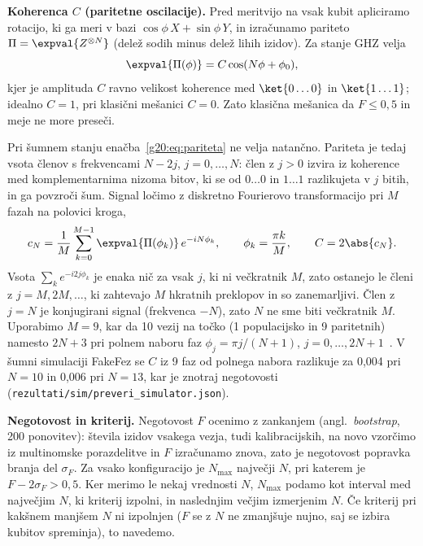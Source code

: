\textbf{Koherenca $C$ (paritetne oscilacije).} Pred meritvijo na vsak kubit apliciramo rotacijo, ki ga meri v bazi
$\cos\phi\,X+\sin\phi\,Y$, in izračunamo pariteto $\Pi=\expval{Z^{\otimes N}}$ (delež sodih minus delež lihih izidov). Za
stanje GHZ velja
\begin{equation}
\expval{\Pi(\phi)} = C\cos(N\phi + \phi_0),
\label{g20:eq:pariteta}
\end{equation}
kjer je amplituda $C$ ravno velikost koherence med $\ket{0\dots0}$ in $\ket{1\dots1}$; idealno $C=1$, pri klasični mešanici
$C=0$. Zato klasična mešanica da $F\le 0{,}5$ in meje ne more preseči.

Pri šumnem stanju enačba~\eqref{g20:eq:pariteta} ne velja natančno. Pariteta je tedaj vsota členov s frekvencami $N-2j$,
$j=0,\dots,N$: člen z $j>0$ izvira iz koherence med komplementarnima nizoma bitov, ki se od $0\dots0$ in $1\dots1$ razlikujeta v
$j$ bitih, in ga povzroči šum. Signal ločimo z diskretno Fourierovo transformacijo pri $M$ fazah na polovici kroga,
\begin{equation}
c_N = \frac{1}{M}\sum_{k=0}^{M-1} \expval{\Pi(\phi_k)}\, e^{-iN\phi_k}, \qquad \phi_k=\frac{\pi k}{M}, \qquad C = 2\abs{c_N}.
\label{g20:eq:dft}
\end{equation}
Vsota $\sum_k e^{-i2j\phi_k}$ je enaka nič za vsak $j$, ki ni večkratnik $M$, zato ostanejo le členi z $j=M, 2M,\dots$, ki
zahtevajo $M$ hkratnih preklopov in so zanemarljivi. Člen z $j=N$ je konjugirani signal (frekvenca $-N$), zato $N$ ne sme
biti večkratnik $M$. Uporabimo $M=9$, kar da 10 vezij na točko (1 populacijsko in 9 paritetnih) namesto $2N+3$ pri polnem
naboru faz $\phi_j=\pi j/(N+1)$, $j=0,\dots,2N+1$~\cite{g20:wei2020}. V šumni simulaciji FakeFez se $C$ iz 9 faz od polnega
nabora razlikuje za 0,004 pri $N=10$ in 0,006 pri $N=13$, kar je znotraj negotovosti (\texttt{rezultati/sim/preveri\_simulator.json}).

\textbf{Negotovost in kriterij.} Negotovost $F$ ocenimo z zankanjem (angl.\ \emph{bootstrap}, 200 ponovitev): števila izidov
vsakega vezja, tudi kalibracijskih, na novo vzorčimo iz multinomske porazdelitve in $F$ izračunamo znova, zato je negotovost
popravka branja del $\sigma_F$. Za vsako konfiguracijo je $N_{\max}$ največji $N$, pri katerem je $F-2\sigma_F>0{,}5$. Ker
merimo le nekaj vrednosti $N$, $N_{\max}$ podamo kot interval med največjim $N$, ki kriterij izpolni, in naslednjim večjim
izmerjenim $N$. Če kriterij pri kakšnem manjšem $N$ ni izpolnjen ($F$ se z $N$ ne zmanjšuje nujno, saj se izbira kubitov spreminja), to navedemo.

